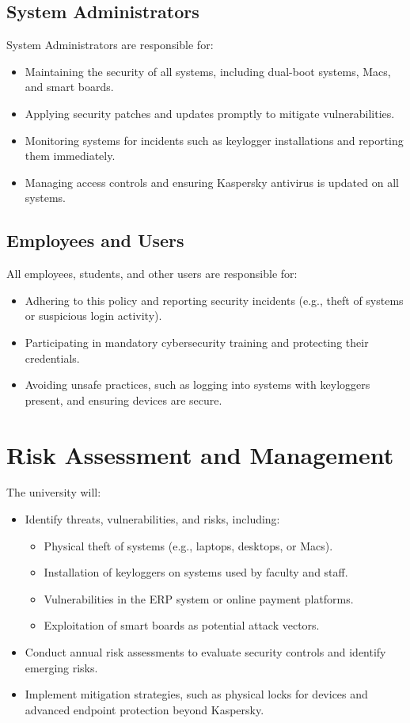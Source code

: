 \documentclass[11pt]{article}
\begin{document}
\subsection{System Administrators}
System Administrators are responsible for:
\begin{itemize}
    \item Maintaining the security of all systems, including dual-boot systems, Macs, and smart boards.
    \item Applying security patches and updates promptly to mitigate vulnerabilities.
    \item Monitoring systems for incidents such as keylogger installations and reporting them immediately.
    \item Managing access controls and ensuring Kaspersky antivirus is updated on all systems.
\end{itemize}

\subsection{Employees and Users}
All employees, students, and other users are responsible for:
\begin{itemize}
    \item Adhering to this policy and reporting security incidents (e.g., theft of systems or suspicious login activity).
    \item Participating in mandatory cybersecurity training and protecting their credentials.
    \item Avoiding unsafe practices, such as logging into systems with keyloggers present, and ensuring devices are secure.
\end{itemize}

\section{Risk Assessment and Management}
The university will:
\begin{itemize}
    \item Identify threats, vulnerabilities, and risks, including:
    \begin{itemize}
        \item Physical theft of systems (e.g., laptops, desktops, or Macs).
        \item Installation of keyloggers on systems used by faculty and staff.
        \item Vulnerabilities in the ERP system or online payment platforms.
        \item Exploitation of smart boards as potential attack vectors.
    \end{itemize}
    \item Conduct annual risk assessments to evaluate security controls and identify emerging risks.
    \item Implement mitigation strategies, such as physical locks for devices and advanced endpoint protection beyond Kaspersky.
\end{itemize}
\end{document}
